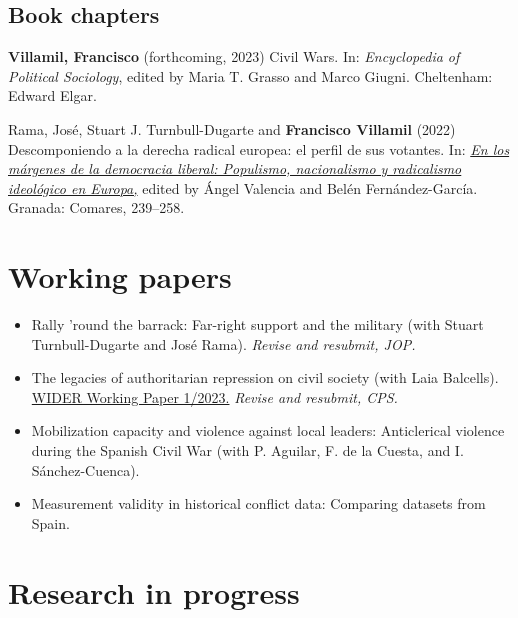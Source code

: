 \documentclass[a4paper, 12pt]{article}
\begin{document}
\subsection*{Book chapters}

\begin{etaremune}[leftmargin=12pt, itemsep=0pt]
\item \textbf{Villamil, Francisco} (forthcoming, 2023) Civil Wars. In: \textit{Encyclopedia of Political Sociology}, edited by Maria T. Grasso and Marco Giugni. Cheltenham: Edward Elgar.
\item Rama, José, Stuart J. Turnbull-Dugarte and \textbf{Francisco Villamil} (2022) Descomponiendo a la derecha radical europea: el perfil de sus votantes. In: \href{https://www.comares.com/libro/en-los-margenes-de-la-democracia-liberal_143816/}{\textit{En los márgenes de la democracia liberal: Populismo, nacionalismo y radicalismo ideológico en Europa,}} edited by Ángel Valencia and Belén Fernández-García. Granada: Comares, 239--258. %
\end{etaremune}



\section*{Working papers}

\begin{itemize}[leftmargin=*, nolistsep]
\item Rally 'round the barrack: Far-right support and the military (with Stuart Turnbull-Dugarte and José Rama). \textit{Revise and resubmit, JOP.}
\item The legacies of authoritarian repression on civil society (with Laia Balcells).\\\href{https://doi.org/10.35188/UNU-WIDER/2023/309-3}{WIDER Working Paper 1/2023.} \textit{Revise and resubmit, CPS.}
\item Mobilization capacity and violence against local leaders: Anticlerical violence during the Spanish Civil War (with P. Aguilar, F. de la Cuesta, and I. Sánchez-Cuenca).
\item Measurement validity in historical conflict data: Comparing datasets from Spain.
\end{itemize}

\section*{Research in progress}
\end{document}

